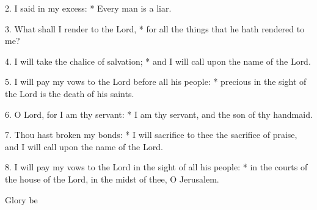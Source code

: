 
2. I said in my excess: * Every man is a liar.

3. What shall I render to the Lord, * for all the things that he hath rendered to me?

4. I will take the chalice of salvation; * and I will call upon the name of the Lord.

5.  I will pay my vows to the Lord before all his people: * precious in the sight of the Lord is the death of his saints.

6.  O Lord, for I am thy servant: * I am thy servant, and the son of thy handmaid.

7. Thou hast broken my bonds: * I will sacrifice to thee the sacrifice of praise, and I will call upon the name of the Lord.

8.  I will pay my vows to the Lord in the sight of all his people: * in the courts of the house of the Lord, in the midst of thee, O Jerusalem.

Glory be